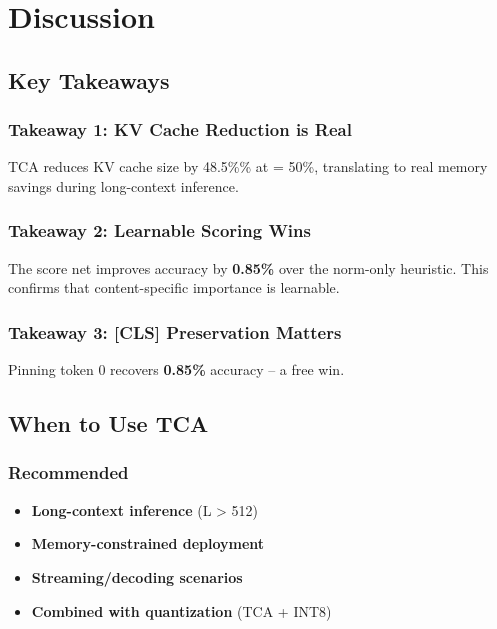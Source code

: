 \section{Discussion}

\subsection{Key Takeaways}

\subsubsection{Takeaway 1: KV Cache Reduction is Real}

TCA reduces KV cache size by 48.5\%\% at   = 50\%, translating 
to real memory savings during long-context inference.

\subsubsection{Takeaway 2: Learnable Scoring Wins}

The score net improves accuracy by \textbf{0.85\%} over the norm-only 
heuristic. This confirms that content-specific importance is learnable.

\subsubsection{Takeaway 3: [CLS] Preservation Matters}

Pinning token 0 recovers \textbf{0.85\%} accuracy -- a free win.

\subsection{When to Use TCA}

\subsubsection{Recommended}
\begin{itemize}
\item \textbf{Long-context inference} (L \textgreater{} 512)
\item \textbf{Memory-constrained deployment}
\item \textbf{Streaming/decoding scenarios}
\item \textbf{Combined with quantization} (TCA + INT8)

\end{itemize}
